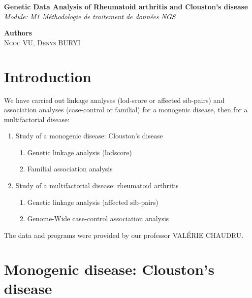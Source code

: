 \documentclass[a4paper,12pt]{article}
\begin{document}
\begin{titlepage}
    \begin{center}
        {\Large \textbf{Genetic Data Analysis of Rheumatoid arthritis and Clouston's disease}} \\[1cm] 
        
        \textit{Module: M1 Méthodologie de traitement de données NGS} \\[3cm]
        

        \vfill %

        \textbf{Authors} \\[0.5cm]
        \textsc{Ngoc VU, Denys BURYI}


    \end{center}
\end{titlepage}

\newpage


\section*{Introduction}

We have carried out linkage analyses (lod-score or affected sib-pairs) 
and association analyses (case-control or familial) for a monogenic disease, then for a multifactorial disease:
\begin{enumerate}
    \item Study of a monogenic disease: Clouston's disease
    \begin{enumerate}
        \item Genetic linkage analysis (lodscore)
        \item Familial association analysis
    \end{enumerate}
    \item Study of a multifactorial disease: rheumatoid arthritis
    \begin{enumerate}
        \item Genetic linkage analysis (affected sib-pairs)
        \item Genome-Wide case-control association analysis
    \end{enumerate}
\end{enumerate}

 
The data and programs were provided by our professor VALÉRIE CHAUDRU.

\section{Monogenic disease: Clouston's disease}
\end{document}
